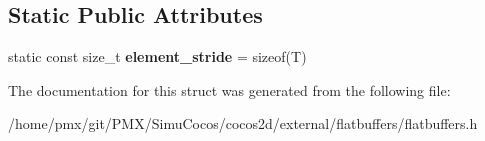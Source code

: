 \subsection*{Static Public Attributes}
\begin{DoxyCompactItemize}
\item 
\mbox{\label{structflatbuffers_1_1IndirectHelper_a4e91b2985bb81f1bd5a526a76f6e9f19}} 
static const size\+\_\+t {\bfseries element\+\_\+stride} = sizeof(T)
\end{DoxyCompactItemize}


The documentation for this struct was generated from the following file\+:\begin{DoxyCompactItemize}
\item 
/home/pmx/git/\+P\+M\+X/\+Simu\+Cocos/cocos2d/external/flatbuffers/flatbuffers.\+h\end{DoxyCompactItemize}
